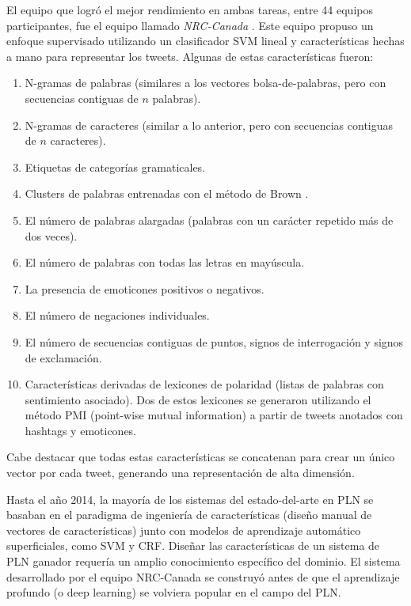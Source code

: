 El equipo que logró el mejor rendimiento en ambas tareas, entre 44 equipos participantes, fue el equipo llamado \emph{NRC-Canada} \cite{Mohammad2013}. Este equipo propuso un enfoque supervisado utilizando un clasificador SVM lineal y características hechas a mano para representar los tweets. Algunas de estas características fueron:

\begin{enumerate}
  \item N-gramas de palabras (similares a los vectores bolsa-de-palabras, pero con secuencias contiguas de $n$ palabras).
  \item N-gramas de caracteres (similar a lo anterior, pero con secuencias contiguas de $n$ caracteres).
  \item Etiquetas de categorías gramaticales.
  \item Clusters de palabras entrenadas con el método de Brown \cite{brown1992class}.
  \item El número de palabras alargadas (palabras con un carácter repetido más de dos veces).
  \item El número de palabras con todas las letras en mayúscula.
  \item La presencia de emoticones positivos o negativos.
  \item El número de negaciones individuales.
  \item El número de secuencias contiguas de puntos, signos de interrogación y signos de exclamación.
  \item Características derivadas de lexicones de polaridad \cite{Mohammad2013} (listas de palabras con sentimiento asociado). Dos de estos lexicones se generaron utilizando el método PMI (point-wise mutual information) a partir de tweets anotados con hashtags y emoticones.
\end{enumerate}

Cabe destacar que todas estas características se concatenan para crear un único vector por cada tweet, generando una representación de alta dimensión.

Hasta el año 2014, la mayoría de los sistemas del estado-del-arte en PLN se basaban en el paradigma de ingeniería de características (diseño manual de vectores de características) junto con modelos de aprendizaje automático superficiales, como SVM y CRF. Diseñar las características de un sistema de PLN ganador requería un amplio conocimiento específico del dominio. El sistema desarrollado por el equipo NRC-Canada se construyó antes de que el aprendizaje profundo (o deep learning) se volviera popular en el campo del PLN. 

